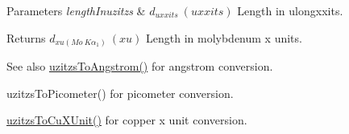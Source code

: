 \begin{DoxyParams}{Parameters}
{\em length\+Inuzitzs} & $ d_{uxxits}\ (uxxits)$ Length in ulongxxits. \\
\hline
\end{DoxyParams}
\begin{DoxyReturn}{Returns}
$ d_{xu(Mo\ K\alpha_1)}\ (xu)$ Length in molybdenum x units. 
\end{DoxyReturn}
\begin{DoxySeeAlso}{See also}
\mbox{\hyperlink{group___e_g_x_math-_conversions-_length_conversions-uzitzs-_non-_s_i_gaaaecee65b1db5abcc71e18526e7073eb}{uzitzs\+To\+Angstrom()}} for angstrom conversion. 

uzitzs\+To\+Picometer() for picometer conversion. 

\mbox{\hyperlink{group___e_g_x_math-_conversions-_length_conversions-uzitzs-_non-_s_i_gab25470e41b88c41d4bf32622baa6c472}{uzitzs\+To\+Cu\+X\+Unit()}} for copper x unit conversion. 
\end{DoxySeeAlso}
